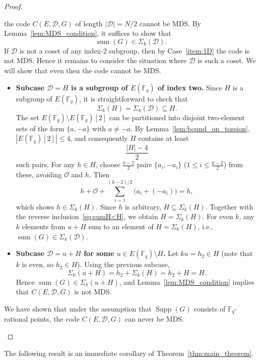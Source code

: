 \documentclass[journal,12pt,onecolumn]{IEEEtran}
\newcommand{\Point}{\operatorname{sum}}
\newcommand{\sumset}{\Sigma}
\begin{document}
\begin{proof}
\begin{enumerate}
the code $C(E, \mathcal{D}, G)$ of length $|\mathcal{D}| = N/2$ cannot be MDS. By Lemma~\ref{lem:MDS_condition}, it suffices to show that
\[
\Point(G) \in \sumset_k(\mathcal{D}).
\]
If $\mathcal{D}$ is not a coset of any index-2 subgroup, then by Case~\ref{item:1D} the code is not MDS. Hence it remains to consider the situation where $\mathcal{D}$ is such a coset. We will show that even then the code cannot be MDS.
    \begin{itemize}
        \item \textbf{Subcase $\mathcal{D} = H$ is a subgroup of $E(\mathbb{F}_q)$ of index two.} Since $H$ is a subgroup of $E(\mathbb{F}_q)$, it is straightforward to check that
        \begin{equation}\label{eq:sumH<H}
            \sumset_k(H) = \sumset_k(\mathcal{D}) \subseteq H.
        \end{equation}
        The set $E(\mathbb{F}_q) \setminus E(\mathbb{F}_q)[2]$ can be partitioned into disjoint two‑element sets of the form $\{a, -a\}$ with $a \neq -a$. By Lemma~\ref{lem:bound_on_torsion}, $|E(\mathbb{F}_q)[2]| \le 4$, and consequently $H$ contains at least
        \[
        \frac{|H| - 4}{2}
        \]
        such pairs. For any $h \in H$, choose $\frac{k-2}{2}$ pairs $\{a_i, -a_i\}$ ($1 \le i \le \frac{k-2}{2}$) from these, avoiding $\mathcal{O}$ and $h$. Then
        \[
        h + \mathcal{O} + \sum_{i=1}^{(k-2)/2} \bigl(a_i + (-a_i)\bigr) = h,
        \]
        which shows $h \in \sumset_k(H)$. Since $h$ is arbitrary, $H \subseteq \sumset_k(H)$. Together with the reverse inclusion~\eqref{eq:sumH<H}, we obtain $H = \sumset_k(H)$.
        For even $k$, any $k$ elements from $u+H$ sum to an element of $H = \sumset_k(H)$, i.e., $\Point(G) \in \sumset_k(\mathcal{D})$.
        \item \textbf{Subcase $\mathcal{D} = u + H$ for some $u \in E(\mathbb{F}_q) \setminus H$.} Let $k u = h_2 \in H$ (note that $k$ is even, so $h_2 \in H$). Using the previous subcase,
        \[
        \sumset_k(u+H) = h_2 + \sumset_k(H) = h_2 + H = H.
        \]
        Hence $\Point(G) \in \sumset_k(u+H)$, and Lemma~\ref{lem:MDS_condition} implies that $C(E, \mathcal{D}, G)$ is not MDS.
    \end{itemize}
We have shown that under the assumption that $\operatorname{Supp}(G)$ consists of $\mathbb{F}_q$-rational points, the code $C(E, \mathcal{D}, G)$ can never be MDS.  
\end{enumerate}
\end{proof}
The following result is an immediate corollary of Theorem~\ref{thm:main_theorem}.
\end{document}
